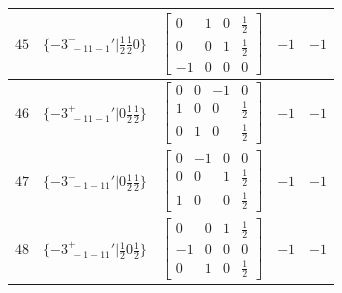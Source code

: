 \documentclass[fleqn,8pt]{jsarticle}
\begin{document}
\begin{longtable}{ccccc}
$ 45 $ & $ \{-3^{-}_{\,\,-11-1}{}'|\frac{1}{2} \frac{1}{2} 0\} $ & $ \begin{bmatrix} 0 & 1 & 0 & \frac{1}{2} \\ 0 & 0 & 1 & \frac{1}{2} \\ -1 & 0 & 0 & 0 \end{bmatrix} $ & $ -1 $ & $ -1 $ \\ \hline
$ 46 $ & $ \{-3^{+}_{\,\,-11-1}{}'|0 \frac{1}{2} \frac{1}{2}\} $ & $ \begin{bmatrix} 0 & 0 & -1 & 0 \\ 1 & 0 & 0 & \frac{1}{2} \\ 0 & 1 & 0 & \frac{1}{2} \end{bmatrix} $ & $ -1 $ & $ -1 $ \\ \hline
$ 47 $ & $ \{-3^{-}_{\,\,-1-11}{}'|0 \frac{1}{2} \frac{1}{2}\} $ & $ \begin{bmatrix} 0 & -1 & 0 & 0 \\ 0 & 0 & 1 & \frac{1}{2} \\ 1 & 0 & 0 & \frac{1}{2} \end{bmatrix} $ & $ -1 $ & $ -1 $ \\ \hline
$ 48 $ & $ \{-3^{+}_{\,\,-1-11}{}'|\frac{1}{2} 0 \frac{1}{2}\} $ & $ \begin{bmatrix} 0 & 0 & 1 & \frac{1}{2} \\ -1 & 0 & 0 & 0 \\ 0 & 1 & 0 & \frac{1}{2} \end{bmatrix} $ & $ -1 $ & $ -1 $ \\
\end{longtable}
\end{document}
